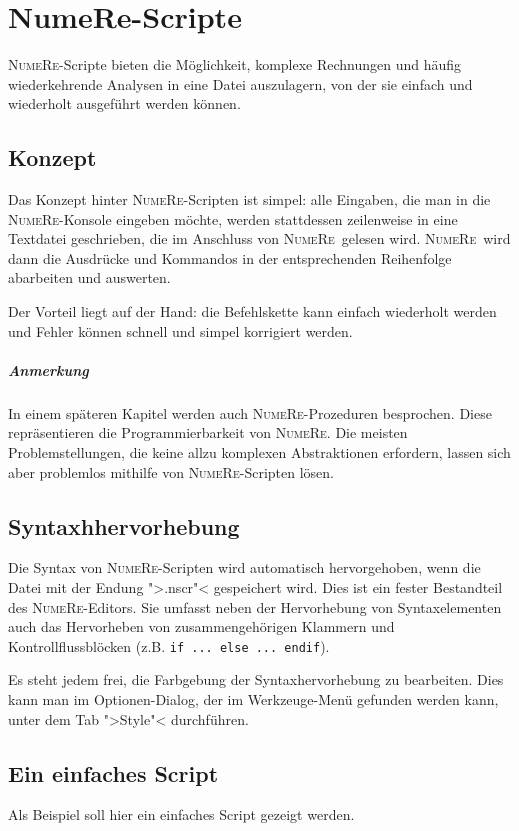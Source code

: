 \documentclass[DIV=14,headsepline,footsepline]{scrbook}
\newcommand{\NR}{\textsc{Nu\-me\-Re}}
\begin{document}
		\chapter{NumeRe-Scripte}
			\NR-Scripte bieten die Möglichkeit, komplexe Rechnungen und häufig wiederkehrende Analysen in eine Datei auszulagern, von der sie einfach und wiederholt ausgeführt werden können.
			\section{Konzept}
				Das Konzept hinter \NR-Scripten ist simpel: alle Eingaben, die man in die \NR-Konsole eingeben möchte, werden stattdessen zeilenweise in eine Textdatei geschrieben, die im Anschluss von \NR\ gelesen wird. \NR\ wird dann die Ausdrücke und Kommandos in der entsprechenden Reihenfolge abarbeiten und auswerten.
				
				Der Vorteil liegt auf der Hand: die Befehlskette kann einfach wiederholt werden und Fehler können schnell und simpel korrigiert werden.
				\paragraph{Anmerkung}
					In einem späteren Kapitel werden auch \NR-Prozeduren besprochen. Diese repräsentieren die Programmierbarkeit von \NR. Die meisten Problemstellungen, die keine allzu komplexen Abstraktionen erfordern, lassen sich aber problemlos mithilfe von \NR-Scripten lösen.
				
			\section{Syntaxhhervorhebung}
				Die Syntax von \NR-Scripten wird automatisch hervorgehoben, wenn die Datei mit der Endung ">.nscr"< gespeichert wird. Dies ist ein fester Bestandteil des \NR-Editors. Sie umfasst neben der Hervorhebung von Syntaxelementen auch das Hervorheben von zusammengehörigen Klammern und Kontrollflussblöcken (z.B. \lstinline+if ... else ... endif+).
				
				Es steht jedem frei, die Farbgebung der Syntaxhervorhebung zu bearbeiten. Dies kann man im Optionen-Dialog, der im Werkzeuge-Menü gefunden werden kann, unter dem Tab ">Style"< durchführen. 
			\section{Ein einfaches Script}
				Als Beispiel soll hier ein einfaches Script gezeigt werden.
				
\end{document}
